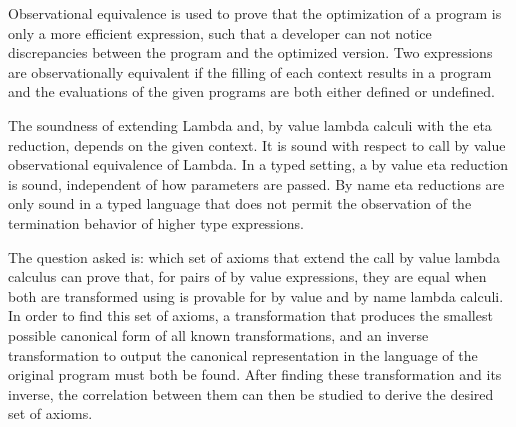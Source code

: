 
Observational equivalence is used to prove that the optimization of a program is only a more efficient expression, such that a developer can not notice discrepancies between the program and the optimized version. Two expressions are observationally equivalent if the filling of each context results in a program and the evaluations of the given programs are both either defined or undefined.

The soundness of extending Lambda and, by value lambda calculi with the eta reduction, depends on the given context. It is sound with respect to call by value observational equivalence of Lambda. In a typed setting, a by value eta reduction is sound, independent of how parameters are passed. By name eta reductions are only sound in a typed language that does not permit the observation of the termination behavior of higher type expressions.


The question asked is: which set of axioms that extend the call by value lambda calculus can prove that, for pairs of by value expressions, they are equal when both are transformed using \cps is provable for by value and by name lambda calculi.  In order to find this set of axioms, a \cps transformation that produces the smallest possible canonical form of all known \cps transformations, and an inverse \cps transformation to output the canonical representation in the language of the original program must both be found.  After finding these \cps transformation and its inverse, the correlation between them can then be studied to derive the desired set of axioms.

